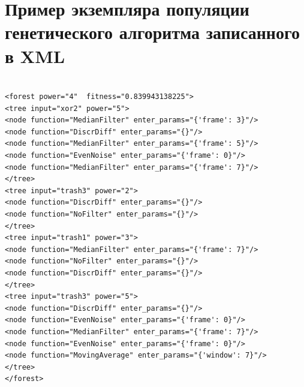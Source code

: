 \documentclass[utf8,usehyperref,14pt]{G7-32}
\begin{document}
\chapter{Пример экземпляра популяции генетического алгоритма записанного в XML}
\label{XML}
\begin{lstlisting}

<forest power="4"  fitness="0.839943138225">
<tree input="xor2" power="5">
<node function="MedianFilter" enter_params="{'frame': 3}"/>
<node function="DiscrDiff" enter_params="{}"/>
<node function="MedianFilter" enter_params="{'frame': 5}"/>
<node function="EvenNoise" enter_params="{'frame': 0}"/>
<node function="MedianFilter" enter_params="{'frame': 7}"/>
</tree>
<tree input="trash3" power="2">
<node function="DiscrDiff" enter_params="{}"/>
<node function="NoFilter" enter_params="{}"/>
</tree>
<tree input="trash1" power="3">
<node function="MedianFilter" enter_params="{'frame': 7}"/>
<node function="NoFilter" enter_params="{}"/>
<node function="DiscrDiff" enter_params="{}"/>
</tree>
<tree input="trash3" power="5">
<node function="DiscrDiff" enter_params="{}"/>
<node function="EvenNoise" enter_params="{'frame': 0}"/>
<node function="MedianFilter" enter_params="{'frame': 7}"/>
<node function="EvenNoise" enter_params="{'frame': 0}"/>
<node function="MovingAverage" enter_params="{'window': 7}"/>
</tree>
</forest>
\end{lstlisting}

\end{document}

